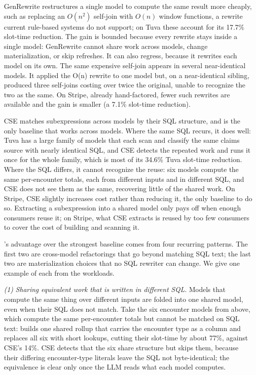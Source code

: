  GenRewrite restructures a single model to compute the same result more cheaply, such as replacing an $O(n^2)$ self-join with $O(n)$ window functions, a rewrite current rule-based systems do not support; on Tuva these account for its 17.7\% slot-time reduction. The gain is bounded because every rewrite stays inside a single model: GenRewrite cannot share work across models, change materialization, or skip refreshes. It can also regress, because it rewrites each model on its own. The same expensive self-join appears in several near-identical models. It applied the O(n) rewrite to one model but, on a near-identical sibling, produced three self-joins costing over twice the original, unable to recognize the two as the same. On Stripe, already hand-factored, fewer such rewrites are available and the gain is smaller (a 7.1\% slot-time reduction). 

 CSE matches subexpressions across models by their SQL structure, and is the only baseline that works across models. Where the same SQL recurs, it does well: Tuva has a large family of models that each scan and classify the same claims source with nearly identical SQL, and CSE detects the repeated work and runs it once for the whole family, which is most of its 34.6\% Tuva slot-time reduction. Where the SQL differs, it cannot recognize the reuse: six models compute the same per-encounter totals, each from different inputs and in different SQL, and CSE does not see them as the same, recovering little of the shared work. On Stripe, CSE slightly increases cost rather than reducing it, the only baseline to do so. Extracting a subexpression into a shared model only pays off when enough consumers reuse it; on Stripe, what CSE extracts is reused by too few consumers to cover the cost of building and scanning it. 



 \dagsmith{}'s advantage over the strongest baseline comes from four recurring patterns. The first two are cross-model refactorings that go beyond matching SQL text; the last two are materialization choices that no SQL rewriter can change. We give one example of each from the workloads.

\emph{(1) Sharing equivalent work that is written in different SQL.} Models that compute the same thing over different inputs are folded into one shared model, even when their SQL does not match. Take the six encounter models from above, which compute the same per-encounter totals but cannot be matched on SQL text: \dagsmith{} builds one shared rollup that carries the encounter type as a column and replaces all six with short lookups, cutting their slot-time by about 77\%, against CSE's 14\%.  CSE detects that the six share structure but skips them, because their differing encounter-type literals leave the SQL not byte-identical; the equivalence is clear only once the LLM reads what each model computes.

